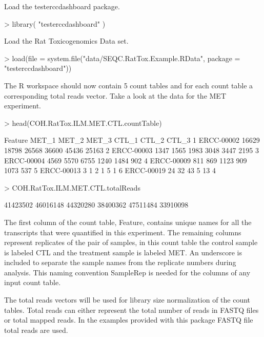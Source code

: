 \documentclass{article}
\begin{document}
Load the testerccdashboard package. 
\begin{Schunk}
\begin{Sinput}
> library( "testerccdashboard" )
\end{Sinput}
\end{Schunk}
Load the Rat Toxicogenomics Data set.
\begin{Schunk}
\begin{Sinput}
> load(file = system.file("data/SEQC.RatTox.Example.RData", 
                          package = "testerccdashboard"))
\end{Sinput}
\end{Schunk}
The R workspace should now contain 5 count tables and for each count table a 
corresponding total reads vector.
Take a look at the data for the MET experiment.
\begin{Schunk}
\begin{Sinput}
> head(COH.RatTox.ILM.MET.CTL.countTable)
\end{Sinput}
\begin{Soutput}
     Feature MET_1 MET_2 MET_3 CTL_1 CTL_2 CTL_3
1 ERCC-00002 16629 18798 26568 36600 45436 25163
2 ERCC-00003  1347  1565  1983  3048  3447  2195
3 ERCC-00004  4569  5570  6755  1240  1484   902
4 ERCC-00009   811   869  1123   909  1073   537
5 ERCC-00013     3     1     2     1     5     1
6 ERCC-00019    24    32    43     5    13     4
\end{Soutput}
\begin{Sinput}
> COH.RatTox.ILM.MET.CTL.totalReads
\end{Sinput}
\begin{Soutput}
[1] 41423502 46016148 44320280 38400362 47511484 33910098
\end{Soutput}
\end{Schunk}
The first column of the count table, Feature, contains unique names for all
the transcripts that were quantified in this experiment. The remaining columns
represent replicates of the pair of samples, in this count table 
the control sample is labeled CTL and the treatment sample is labeled MET. An underscore is included to separate the sample names from the replicate numbers during analysis. This naming convention Sample\textunderscore{}Rep is needed for the columns of any input count table.

The total reads vectors will be used for library size normalization of the count
tables. Total reads can either represent the total number of reads in FASTQ 
files or total mapped reads. In the examples provided with this package FASTQ 
file total reads are used.
\end{document}
